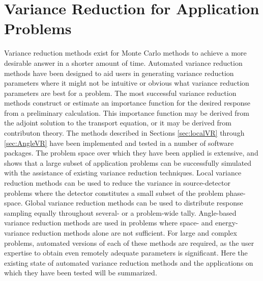 \section{Variance Reduction for Application Problems}
\label{sec:litsummary}

Variance reduction methods exist for Monte Carlo methods to
achieve a more desirable answer in a
shorter amount of time. Automated variance reduction methods have been designed
to aid users in generating variance reduction parameters where it might not be
intuitive or obvious what variance reduction parameters are best for a problem.
The most successful variance reduction methods construct or estimate an
importance function for the desired response from a preliminary calculation.
This importance function may be derived from the adjoint solution to the
transport equation, or it may be derived from contributon theory.
The methods described in Sections \ref{sec:localVR} through \ref{sec:AngleVR}
have been implemented and tested in a number of software packages. The problem
space over which they have been applied is extensive, and shows that a large
subset of application problems can be successfully simulated with the assistance
of existing variance reduction techniques. Local variance reduction methods can
be used to reduce the variance in source-detector problems where the detector
constitutes a small subset of the problem phase-space. Global variance reduction
methods can be used to distribute response sampling equally throughout several-
or a problem-wide tally. Angle-based variance reduction methods are used in
problems where space- and energy- variance reduction methods alone are not
sufficient. For large and complex problems, automated versions of each of these
methods are required, as the user expertise to obtain even remotely adequate
parameters is significant. Here the existing state of automated variance
reduction methods and the applications on which they have been tested will be
summarized.

